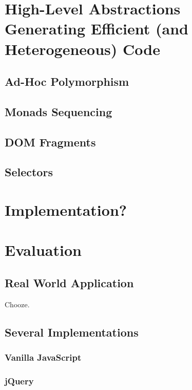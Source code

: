 \documentclass[preprint]{sigplanconf}
\begin{document}
\section{High-Level Abstractions Generating Efficient (and Heterogeneous) Code}
\label{contribution}

\subsection{Ad-Hoc Polymorphism}

\subsection{Monads Sequencing}

\subsection{DOM Fragments}

\subsection{Selectors}

\section{Implementation?}

\section{Evaluation}
\label{validation}

\subsection{Real World Application}

Chooze.

\subsection{Several Implementations}

\subsubsection{Vanilla JavaScript}

\subsubsection{jQuery}
\end{document}
